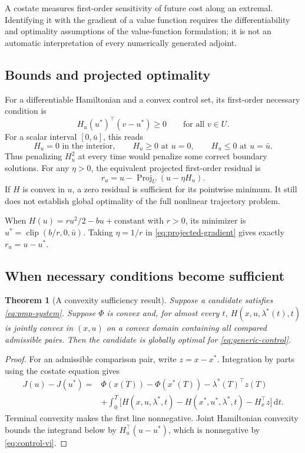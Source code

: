 \documentclass[11pt,a4paper]{article}
\newcommand{\dd}{\,\mathrm{d}}
\DeclareMathOperator{\proj}{Proj}
\DeclareMathOperator{\clip}{clip}
\newtheorem{theorem}[proposition]{Theorem}
\theoremstyle{definition}
\theoremstyle{remark}
\begin{document}
A costate measures first-order sensitivity of future cost along an extremal. Identifying it with the gradient of a value function requires the differentiability and optimality assumptions of the value-function formulation; it is not an automatic interpretation of every numerically generated adjoint.

\subsection{Bounds and projected optimality}
For a differentiable Hamiltonian and a convex control set, its first-order necessary condition is
\begin{equation}
H_u(u^*)^\top(v-u^*)\ge0\qquad\text{for all }v\in U.
\label{eq:control-vi}
\end{equation}
For a scalar interval $[0,\bar u]$, this reads
\begin{equation}
H_u=0\text{ in the interior},\qquad H_u\ge0\text{ at }u=0,
\qquad H_u\le0\text{ at }u=\bar u.
\end{equation}
Thus penalizing $H_u^2$ at every time would penalize some correct boundary solutions. For any $\eta>0$, the equivalent projected first-order residual is
\begin{equation}
r_u=u-\proj_U(u-\eta H_u).
\label{eq:projected-gradient}
\end{equation}
If $H$ is convex in $u$, a zero residual is sufficient for its pointwise minimum. It still does not establish global optimality of the full nonlinear trajectory problem.

When $H(u)=r u^2/2-bu+\text{constant}$ with $r>0$, its minimizer is
$u^*=\clip(b/r,0,\bar u)$. Taking $\eta=1/r$ in \eqref{eq:projected-gradient} gives exactly $r_u=u-u^*$.

\subsection{When necessary conditions become sufficient}
\begin{theorem}[A convexity sufficiency result]
Suppose a candidate satisfies \eqref{eq:pmp-system}. Suppose $\Phi$ is convex and, for almost every $t$, $H(x,u,\lambda^*(t),t)$ is jointly convex in $(x,u)$ on a convex domain containing all compared admissible pairs. Then the candidate is globally optimal for \eqref{eq:generic-control}.
\end{theorem}
\begin{proof}
For an admissible comparison pair, write $z=x-x^*$. Integration by parts using the costate equation gives
\begin{align*}
J(u)-J(u^*)={}&\Phi(x(T))-\Phi(x^*(T))-\lambda^*(T)^\top z(T)\\
&+\int_0^T\big[H(x,u,\lambda^*,t)-H(x^*,u^*,\lambda^*,t)-H_x^\top z\big]\dd t.
\end{align*}
Terminal convexity makes the first line nonnegative. Joint Hamiltonian convexity bounds the integrand below by $H_u^\top(u-u^*)$, which is nonnegative by \eqref{eq:control-vi}.
\end{proof}
\end{document}

